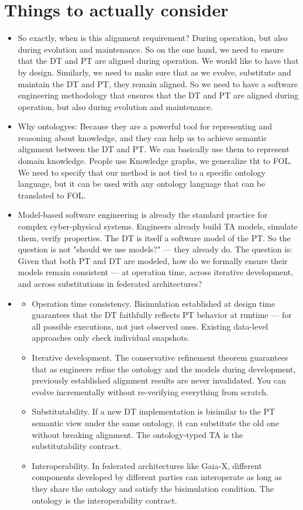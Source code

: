 \section{Things to actually consider}
\begin{itemize}
	\item So exactly, when is this alignment requirement? During operation, but also during evolution and maintenance. So on the one hand, we need to ensure that the DT and PT are aligned during operation. We would like to have that by design. Similarly, we need to make sure that as we evolve, substitute and maintain the DT and PT, they remain aligned. So we need to have a software engineering methodology that ensures that the DT and PT are aligned during operation, but also during evolution and maintenance.
	\item Why ontologyes: Because they are a powerful tool for representing and reasoning about knowledge, and they can help us to achieve semantic alignment between the DT and PT. We can basically use them to represent domain knowledge. People use Knowledge graphs, we generalize tht to FOL. We need to specify that our method is not tied to a specific ontology language, but it can be used with any ontology language that can be translated to FOL.
	\item Model-based software engineering is already the standard practice for complex cyber-physical systems. Engineers already build TA models, simulate them, verify properties. The DT is itself a software model of the PT. So the question is not "should we use models?" — they already do. The question is: Given that both PT and DT are modeled, how do we formally ensure their models remain consistent — at operation time, across iterative development, and across substitutions in federated architectures?
	\item 
	
	\begin{itemize}
		\item Operation time consistency.
Bisimulation established at design time guarantees that the DT faithfully reflects PT behavior at runtime — for all possible executions, not just observed ones. Existing data-level approaches only check individual snapshots.
\item Iterative development.
The conservative refinement theorem guarantees that as engineers refine the ontology and the models during development, previously established alignment results are never invalidated. You can evolve incrementally without re-verifying everything from scratch.
\item Substitutability.
If a new DT implementation is bisimilar to the PT semantic view under the same ontology, it can substitute the old one without breaking alignment. The ontology-typed TA is the substitutability contract.
\item Interoperability.
In federated architectures like Gaia-X, different components developed by different parties can interoperate as long as they share the ontology and satisfy the bisimulation condition. The ontology is the interoperability contract.
	\end{itemize}

\end{itemize}

